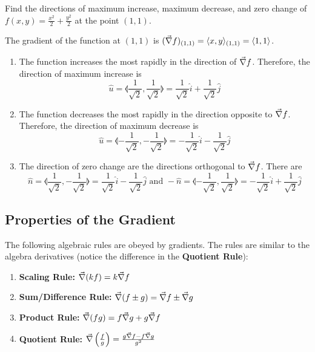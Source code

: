\begin{example}
    \normalfont Find the directions of maximum increase, maximum decrease, and zero change of
    $f(x, y) = \frac{x^2}{2} + \frac{y^2}{2}$ at the point $(1, 1)$.

    The gradient of the function at $(1, 1)$ is $(\vec{\nabla} f)_{(1, 1)} = \langle x, y \rangle_{(1, 1)} = \langle 1, 1\rangle$.

    \begin{enumerate}
        \item
        The function increases the most rapidly in the direction of $\vec{\nabla} f$. Therefore, the direction of maximum increase is
        $$\hat{u} = \llangle \frac{1}{\sqrt{2}}, \frac{1}{\sqrt{2}} \rrangle =
        \frac{1}{\sqrt{2}} \hat{i} + \frac{1}{\sqrt{2}} \hat{j}$$

        \item
        The function decreases the most rapidly in the direction opposite to $\vec{\nabla} f$. Therefore, the
        direction of maximum decrease is
        $$\hat{u} = \llangle -\frac{1}{\sqrt{2}}, -\frac{1}{\sqrt{2}} \rrangle =
        -\frac{1}{\sqrt{2}} \hat{i} - \frac{1}{\sqrt{2}} \hat{j}$$

        \item
        The direction of zero change are the directions orthogonal to $\vec{\nabla} f$. There are
        $$\hat{n} = \llangle \frac{1}{\sqrt{2}}, -\frac{1}{\sqrt{2}} \rrangle =
        \frac{1}{\sqrt{2}} \hat{i} -\frac{1}{\sqrt{2}} \hat{j} \text{ and }
        -\hat{n} = \llangle - \frac{1}{\sqrt{2}}, \frac{1}{\sqrt{2}} \rrangle =
        -\frac{1}{\sqrt{2}} \hat{i} + \frac{1}{\sqrt{2}} \hat{j}$$
    \end{enumerate}
\end{example}


\subsection{Properties of the Gradient}
The following algebraic rules are obeyed by gradients. The rules are similar to the algebra derivatives (notice the
difference in the \textbf{Quotient Rule}):

\begin{enumerate}
    \item \textbf{Scaling Rule:} $\vec{\nabla} (kf) = k \vec{\nabla} f$
    \item \textbf{Sum/Difference Rule:} $\vec{\nabla} (f \pm g) = \vec{\nabla} f \pm \vec{\nabla} g$
    \item \textbf{Product Rule:} $\vec{\nabla} (fg) = f \vec{\nabla} g + g \vec{\nabla} f$
    \item \textbf{Quotient Rule:} $\vec{\nabla} \left( \frac{f}{g} \right) = \frac{g\vec{\nabla} f - f\vec{\nabla} g}{g^2}$
\end{enumerate}
